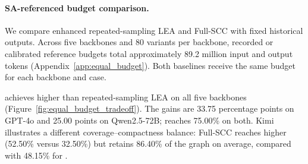 \begin{revadded}
\paragraph{SA-referenced budget comparison.}

We compare enhanced repeated-sampling LEA and Full-SCC with fixed historical \samcgs{} outputs. Across five backbones and 80 variants per backbone, recorded or calibrated \samcgs{} reference budgets total approximately 89.2 million input and output tokens (Appendix~\ref{app:equal_budget}). Both baselines receive the same budget for each backbone and case.

\samcgs{} achieves higher \riskall{} than repeated-sampling LEA on all five backbones (Figure~\ref{fig:equal_budget_tradeoff}). The gains are 33.75 percentage points on GPT-4o and 25.00 points on Qwen2.5-72B; \samcgs{} reaches 75.00\% on both. Kimi illustrates a different coverage--compactness balance: Full-SCC reaches higher \riskall{} (52.50\% versus 32.50\%) but retains 86.40\% of the graph on average, compared with 48.15\% for \samcgs{}.


\end{revadded}
